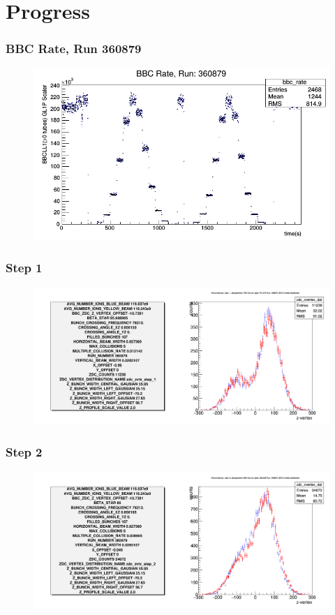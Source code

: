 \section{Progress}
\label{sec:progress}

\begin{frame}
  \frametitle{BBC Rate, Run 360879}
  \begin{figure}
    \includegraphics[width=\linewidth]{"./figures/bbc_rate_360879"}
    \caption{}
    \label{fig:run_360879}
  \end{figure}
\end{frame}

\begin{frame}
  \frametitle{Step 1}
  \begin{figure}
    \includegraphics[width=\linewidth]{"./figures/tuned_simulation_step_1"}
    \caption{}
    \label{fig:step_1}
  \end{figure}
\end{frame}

\begin{frame}
  \frametitle{Step 2}
  \begin{figure}
    \includegraphics[width=\linewidth]{"./figures/tuned_simulation_step_2"}
    \caption{}
    \label{fig:step_2}
  \end{figure}
\end{frame}

